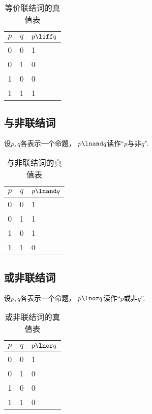 \begin{table}[ht]
	\centering
	\begin{tabular}{|*{2}{c|}p{2cm}|}
		\hline
		\(p\) & \(q\) & \(p \liff q\) \\
		\hline
		0 & 0 & 1 \\
		0 & 1 & 0 \\
		1 & 0 & 0 \\
		1 & 1 & 1 \\
		\hline
	\end{tabular}
	\caption{等价联结词的真值表}
\end{table}

\subsection{与非联结词}
设\(p,q\)各表示一个命题，
\(p \lnand q\)读作“\(p\)与非\(q\)”.

\begin{table}[ht]
	\centering
	\begin{tabular}{|*{2}{c|}p{2cm}|}
		\hline
		\(p\) & \(q\) & \(p \lnand q\) \\
		\hline
		0 & 0 & 1 \\
		0 & 1 & 1 \\
		1 & 0 & 1 \\
		1 & 1 & 0 \\
		\hline
	\end{tabular}
	\caption{与非联结词的真值表}
\end{table}

\subsection{或非联结词}
设\(p,q\)各表示一个命题，
\(p \lnor q\)读作“\(p\)或非\(q\)”.

\begin{table}[ht]
	\centering
	\begin{tabular}{|*{2}{c|}p{2cm}|}
		\hline
		\(p\) & \(q\) & \(p \lnor q\) \\
		\hline
		0 & 0 & 1 \\
		0 & 1 & 0 \\
		1 & 0 & 0 \\
		1 & 1 & 0 \\
		\hline
	\end{tabular}
	\caption{或非联结词的真值表}
\end{table}

